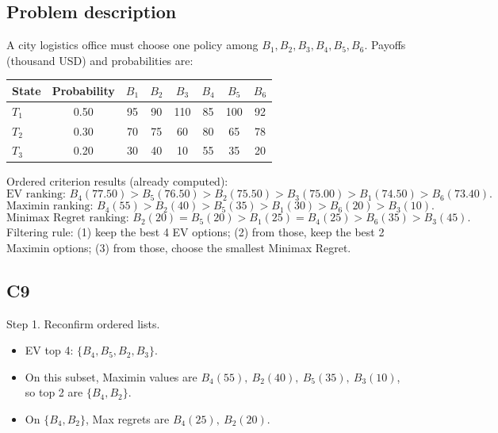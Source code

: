 


	
	\begin{ExamProblems}
		\item\leavevmode\par
		\subsection*{Problem description}
		A city logistics office must choose one policy among $B_1,B_2,B_3,B_4,B_5,B_6$.
		Payoffs (thousand USD) and probabilities are:
		\begin{center}
			\begin{tabular}{l c c c c c c c}
				\toprule
				State & Probability & $B_1$ & $B_2$ & $B_3$ & $B_4$ & $B_5$ & $B_6$ \\
				\midrule
				$T_1$ & 0.50 & 95 & 90 & 110 & 85 & 100 & 92 \\
				$T_2$ & 0.30 & 70 & 75 & 60 & 80 & 65 & 78 \\
				$T_3$ & 0.20 & 30 & 40 & 10 & 55 & 35 & 20 \\
				\bottomrule
			\end{tabular}
		\end{center}
		Ordered criterion results (already computed):
		\[
		\text{EV ranking: }B_4(77.50)>B_5(76.50)>B_2(75.50)>B_3(75.00)>B_1(74.50)>B_6(73.40).
		\]
		\[
		\text{Maximin ranking: }B_4(55)>B_2(40)>B_5(35)>B_1(30)>B_6(20)>B_3(10).
		\]
		\[
		\text{Minimax Regret ranking: }B_2(20)=B_5(20)>B_1(25)=B_4(25)>B_6(35)>B_3(45).
		\]
		Filtering rule:
		(1) keep the best 4 EV options;
		(2) from those, keep the best 2 Maximin options;
		(3) from those, choose the smallest Minimax Regret.

		\subsection*{C9}
		Step 1. Reconfirm ordered lists.
		\begin{itemize}
			\item EV top 4: $\{B_4,B_5,B_2,B_3\}$.
			\item On this subset, Maximin values are $B_4(55),\ B_2(40),\ B_5(35),\ B_3(10)$, so top 2 are $\{B_4,B_2\}$.
			\item On $\{B_4,B_2\}$, Max regrets are $B_4(25),\ B_2(20)$.
		\end{itemize}


\end{ExamProblems}
